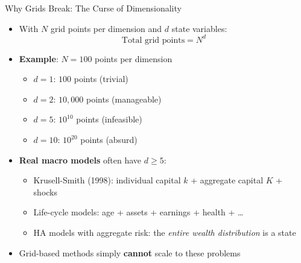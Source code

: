 \documentclass[10pt,english,aspectratio=169]{beamer}
\begin{document}
\begin{frame}{Why Grids Break: The Curse of Dimensionality}
\begin{itemize}
  \item With $N$ grid points per dimension and $d$ state variables:
    \[
      \text{Total grid points} = N^d
    \]
  \item \textbf{Example}: $N = 100$ points per dimension
    \begin{itemize}
      \item $d = 1$: $100$ points \quad (trivial)
      \item $d = 2$: $10{,}000$ points \quad (manageable)
      \item $d = 5$: $10^{10}$ points \quad (infeasible)
      \item $d = 10$: $10^{20}$ points \quad (absurd)
    \end{itemize}
  \medskip
  \item \textbf{Real macro models} often have $d \geq 5$:
    \begin{itemize}
      \item Krusell-Smith (1998): individual capital $k$ + aggregate capital $K$ + shocks
      \item Life-cycle models: age + assets + earnings + health + \ldots
      \item HA models with aggregate risk: the \emph{entire wealth distribution} is a state
    \end{itemize}
  \medskip
  \item Grid-based methods simply \textbf{cannot} scale to these problems
\end{itemize}
\end{frame}
\end{document}
